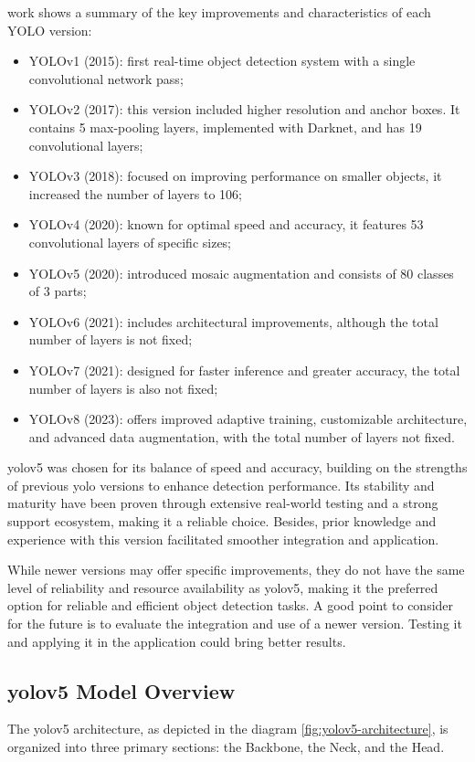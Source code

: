 \citet{rfc51} work shows a summary of the key improvements and characteristics of each YOLO version:
\begin{itemize}
    \item YOLOv1 (2015): first real-time object detection system with a single convolutional network pass; 
    \item YOLOv2 (2017): this version included higher resolution and anchor boxes. It contains 5 max-pooling layers, 
    implemented with Darknet, and has 19 convolutional layers;
    \item YOLOv3 (2018): focused on improving performance on smaller objects, it increased the number of layers to 106;
    \item YOLOv4 (2020): known for optimal speed and accuracy, it features 53 convolutional layers of specific sizes;
    \item YOLOv5 (2020): introduced mosaic augmentation and consists of 80 classes of 3 parts;
    \item YOLOv6 (2021): includes architectural improvements, although the total number of layers is not fixed;
    \item YOLOv7 (2021): designed for faster inference and greater accuracy, the total number of layers is also not fixed;
    \item YOLOv8 (2023): offers improved adaptive training, customizable architecture, and advanced data augmentation, 
    with the total number of layers not fixed.
\end{itemize}

\ac{yolo}v5 was chosen for its balance of speed and accuracy, building on the strengths of previous \ac{yolo} versions to 
enhance detection performance.  Its stability and maturity have been proven through extensive real-world testing 
and a strong support ecosystem, making it a reliable choice. Besides, prior knowledge and experience with this version 
facilitated smoother integration and application.

While newer versions may offer specific improvements, they do not have the same level of reliability and 
resource availability as \ac{yolo}v5, making it the preferred option for reliable and efficient object detection tasks.
A good point to consider for the future is to evaluate the integration and use of a newer version. Testing it and 
applying it in the application could bring better results.

\subsection{\ac{yolo}v5 Model Overview}
The \ac{yolo}v5 architecture, as depicted in the diagram \ref{fig:yolov5-architecture}, is organized into 
three primary sections: the Backbone, the Neck, and the Head.

